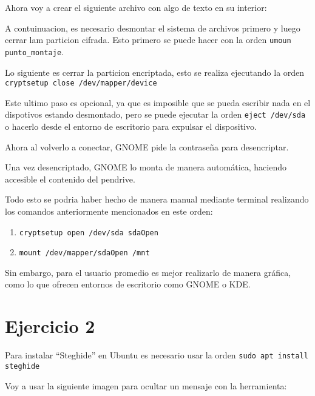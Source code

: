 \documentclass{article}
\begin{document}


Ahora voy a crear el siguiente archivo con algo de texto en su interior:


A contuinuacion, es necesario desmontar el sistema de archivos primero y luego cerrar lam particion cifrada. Esto primero se puede hacer con la orden \verb|umoun punto_montaje|.


Lo siguiente es cerrar la particion encriptada, esto se realiza ejecutando la orden \verb|cryptsetup close /dev/mapper/device|


Este ultimo paso es opcional, ya que es imposible que se pueda escribir nada en el dispotivos estando desmontado, pero se puede ejecutar la orden \verb|eject /dev/sda| o hacerlo desde el entorno de escritorio para expulsar el dispositivo.


Ahora al volverlo a conectar, GNOME pide la contraseña para desencriptar.


Una vez desencriptado, GNOME lo monta de manera automática, haciendo accesible el contenido del pendrive.



Todo esto se podria haber hecho de manera manual mediante terminal realizando los comandos anteriormente mencionados en este orden:

\begin{enumerate}
    \item \verb|cryptsetup open /dev/sda sdaOpen|
    \item \verb|mount /dev/mapper/sdaOpen /mnt|
\end{enumerate}

Sin embargo, para el usuario promedio es mejor realizarlo de manera gráfica, como lo que ofrecen entornos de escritorio como GNOME o KDE.

\section*{Ejercicio 2}

Para instalar ``Steghide'' en Ubuntu es necesario usar la orden \verb|sudo apt install steghide|

Voy a usar la siguiente imagen para ocultar un mensaje con la herramienta:
\end{document}
